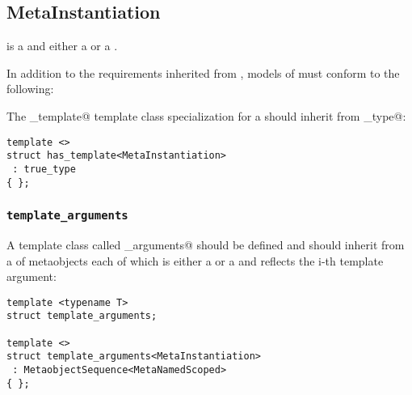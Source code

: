 \subsection{MetaInstantiation}
\label{concept-MetaInstantiation}



 is a  and either a  or a .

In addition to the requirements inherited from ,
models of  must conform to the following:

The \verb@has_template@ template class specialization for a  should
inherit from \verb@true_type@:

\begin{verbatim}
template <>
struct has_template<MetaInstantiation>
 : true_type
{ };
\end{verbatim}

\subsubsection{\texttt{template\_arguments}}

A template class called \verb@template_arguments@ should be defined and should
inherit from a  of  metaobjects
each of which is either a  or a  and reflects
the i-th template argument:

\begin{verbatim}
template <typename T>
struct template_arguments;

template <>
struct template_arguments<MetaInstantiation>
 : MetaobjectSequence<MetaNamedScoped>
{ };
\end{verbatim}

